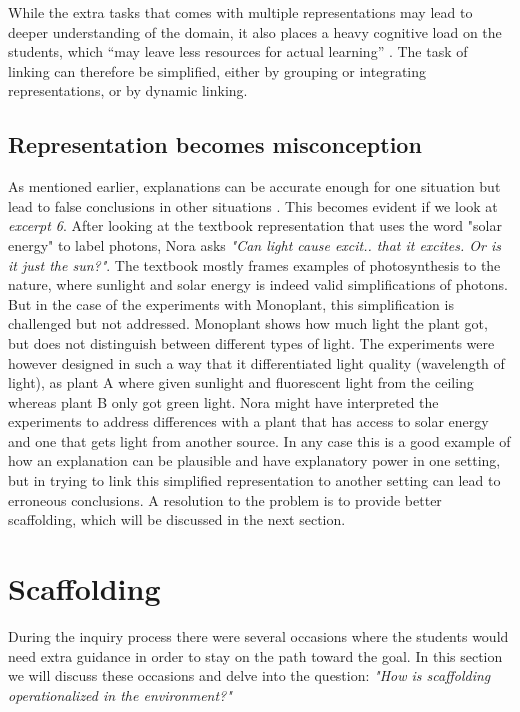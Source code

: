 While the extra tasks that comes with multiple representations may lead to deeper understanding of the domain, it also places a heavy cognitive load on the students, which “may leave less resources for actual learning” \citetext{Sweller, 1988, 1989, referenced in \citealp{van2006supporting}}. The task of linking can therefore be simplified, either by grouping or integrating representations, or by dynamic linking. 

\subsection{Representation becomes misconception}
As mentioned earlier, explanations can be accurate enough for one situation but lead to false conclusions in other situations \citep{smith1994misconceptions}. This becomes evident if we look at \emph{excerpt 6}. After looking at the textbook representation that uses the word "solar energy" to label photons, Nora asks \emph{"Can light cause excit.. that it excites. Or is it just the sun?"}. The textbook mostly frames examples of photosynthesis to the nature, where sunlight and solar energy is indeed valid simplifications of photons. But in the case of the experiments with Monoplant, this simplification is challenged but not addressed. Monoplant shows how much light the plant got, but does not distinguish between different types of light. The experiments were however designed in such a way that it differentiated light quality (wavelength of light), as plant A where given sunlight and fluorescent light from the ceiling whereas plant B only got green light. Nora might have interpreted the experiments to address differences with a plant that has access to solar energy and one that gets light from another source. In any case this is a good example of how an explanation can be plausible and have explanatory power in one setting, but in trying to link this simplified representation to another setting can lead to erroneous conclusions. A resolution to the problem is to provide better scaffolding, which will be discussed in the next section.

\section{Scaffolding}
During the inquiry process there were several occasions where the students would need extra guidance in order to stay on the path toward the goal. In this section we will discuss these occasions and delve into the question: \emph{"How is scaffolding operationalized in the environment?"}

